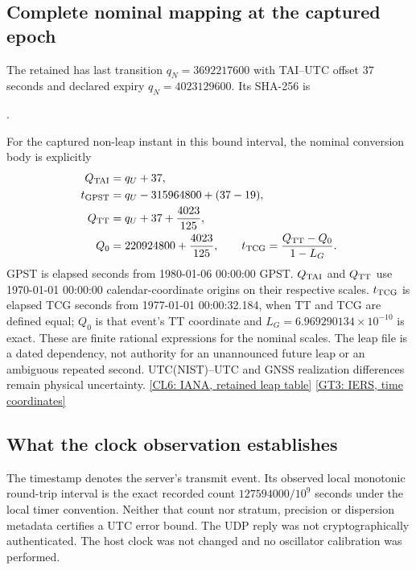 \subsection{Complete nominal mapping at the captured epoch}
The retained  has last transition
$q_N=3692217600$ with TAI--UTC offset $37$ seconds and declared expiry
$q_N=4023129600$. Its SHA-256 is
\begin{center}\small
{}.
\end{center}
For the captured non-leap instant in this bound interval, the nominal
conversion body is explicitly
\begin{align}
 Q_{\rm TAI}&=q_U+37,\nonumber\\
 t_{\rm GPST}&=q_U-315964800+(37-19),\nonumber\\
 Q_{\rm TT}&=q_U+37+\frac{4023}{125},\nonumber\\
 Q_0&=220924800+\frac{4023}{125},\qquad
 t_{\rm TCG}=\frac{Q_{\rm TT}-Q_0}{1-L_G}.
 \label{eq:r14-captured-time-conversion}
\end{align}
GPST is elapsed seconds from 1980-01-06 00:00:00 GPST. $Q_{\rm TAI}$ and
$Q_{\rm TT}$ use 1970-01-01 00:00:00 calendar-coordinate origins on their
respective scales. $t_{\rm TCG}$ is elapsed TCG seconds from
1977-01-01 00:00:32.184, when TT and TCG are defined equal; $Q_0$ is that
event's TT coordinate and $L_G=6.969290134\times10^{-10}$ is exact.
These are finite rational expressions for the nominal scales. The leap file
is a dated dependency, not authority for an unannounced future leap or an
ambiguous repeated second. UTC(NIST)--UTC and GNSS realization differences
remain physical uncertainty.
\href{https://data.iana.org/time-zones/data/leap-seconds.list}{[CL6: IANA, retained leap table]}
\href{https://iers-conventions.obspm.fr/content/chapter10/tn36_c10.pdf}{[GT3: IERS, time coordinates]}

\subsection{What the clock observation establishes}
The timestamp denotes the server's transmit event. Its observed local
monotonic round-trip interval is the exact recorded count
$127594000/10^9$ seconds under the local timer convention. Neither that count
nor stratum, precision or dispersion metadata certifies a UTC error bound.
The UDP reply was not cryptographically authenticated. The host clock was
not changed and no oscillator calibration was performed.

